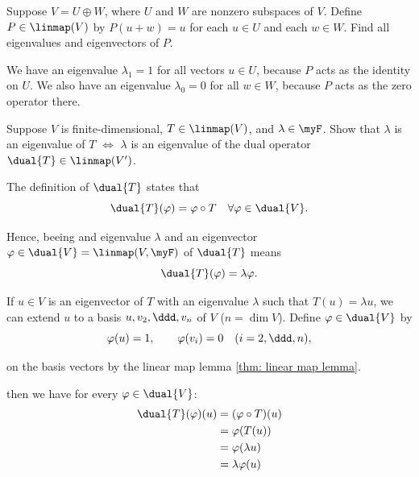 \begin{xrcs}
  Suppose $V = U \oplus W$, where $U$ and $W$ are nonzero subspaces of $V$. Define $P \in \linmap(V)$ by $P(u+w) = u$ for each $u \in U$ and each $w \in W$. Find all eigenvalues and eigenvectors of $P$.

  \begin{xsol}
    We have an eigenvalue $\lambda_1 = 1$ for all vectors $u \in U$, because $P$ acts as the identity on $U$. We also have an eigenvalue $\lambda_0 = 0$ for all $w \in W$, because $P$ acts as the zero operator there.
  \end{xsol}
\end{xrcs}

\begin{xrcs}
  Suppose $V$ is finite-dimensional, $T \in \linmap (V)$, and $\lambda \in \myF$. Show that $\lambda$ is an eigenvalue of $T$ $\iff$ $\lambda$ is an eigenvalue of the dual operator $\dual{T} \in \linmap(V')$.

  \begin{xsol}
    The definition of $\dual{T}$ states that
    \begin{equation}
      \dual{T}(\varphi) = \varphi \circ T \quad \forall \varphi \in \dual{V}.
    \end{equation}

    Hence, beeing and eigenvalue $\lambda$ and an eigenvector $\varphi \in \dual{V} = \linmap(V, \myF)$ of $\dual{T}$ means \begin{equation}
      \dual{T}(\varphi) = \lambda \varphi.
    \end{equation}

    \Rightarrowdirection If $u \in V$ is an eigenvector of $T$ with an eigenvalue $\lambda$ such that $T(u) = \lambda u$, we can extend $u$ to a basis $u, v_2, \ddd, v_n$ of $V$ ($n = \dim V$). Define $\varphi \in \dual{V}$ by
    \begin{equation}
      \varphi (u) = 1, \qquad \varphi(v_i) = 0 \quad (i = 2, \ddd, n),
    \end{equation}

    on the basis vectors by the linear map lemma \ref{thm: linear map lemma}.

    then we have for every $\varphi \in \dual{V}$:
    \begin{equation}
      \begin{aligned}
        \dual{T}(\varphi) (u) &= (\varphi \circ T) (u) \\
          &= \varphi (T(u)) \\
          &= \varphi (\lambda u) \\
          &= \lambda \varphi (u)
      \end{aligned}
    \end{equation}


\end{xsol}
\end{xrcs}
